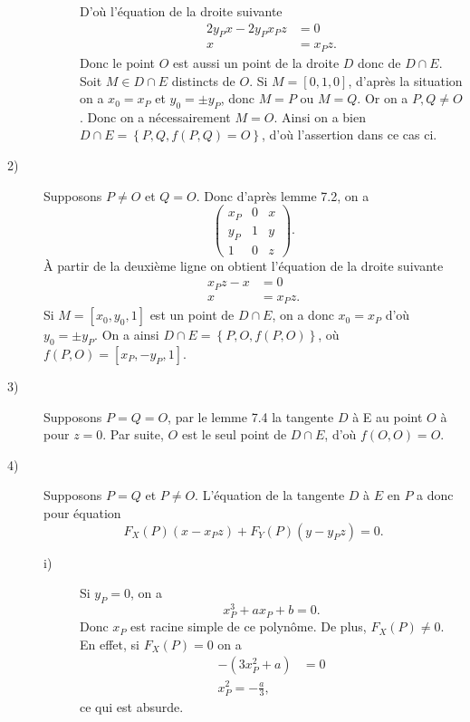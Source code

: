 \begin{demonstration}
\begin{description}
\begin{description}
               D'où l'équation de la droite suivante
               \begin{align*}
                   2y_Px - 2y_Px_Pz &= 0 \\
                   x &= x_Pz
               .\end{align*}
               Donc le point $O$ est aussi un point de la droite $D$ donc de $D \cap E$.  Soit $M \in  D \cap E$ distincts de $O$. Si $M = \left[ 0,1,0 \right]$, d'après la situation on a $x_0 =
               x_P$ et $y_0 = \pm y_P$, donc $M = P$ ou $M = Q$. Or on a $P,Q \neq O$. Donc on a nécessairement $M = O$. Ainsi on a bien $D \cap E = \left\{ P, Q, f(P,Q)= O \right\}$, d'où
               l'assertion dans ce cas ci.
            \end{description}
        \item[2)] Supposons $P \neq O$ et $Q = O$. Donc d'après lemme 7.2, on a
            \[
            \begin{pmatrix}
                x_P & 0 & x \\
                y_P & 1 & y \\
                1   & 0 & z
            \end{pmatrix}
            .\] 
            À partir de la deuxième ligne on obtient l'équation de la droite suivante
            \begin{align*}
                x_Pz - x &= 0 \\
                x &= x_Pz
            .\end{align*}
            Si $M = \left[ x_0, y_0, 1 \right]$ est un point de $D \cap E$, on a donc $x_0 = x_P$ d'où $y_0 = \pm y_P$.
        On a ainsi $D \cap E = \left\{ P, O, f(P,O) \right\}$, où $f(P,O) = \left[ x_P, - y_P, 1 \right]$.
    \item[3)] Supposons $P = Q = O$, par le lemme 7.4 la tangente $D$ à E au point $O$ à pour $z = 0$. Par suite, $O$ est le seul point de $D \cap E$, d'où $f(O,O) = O$.
    \item[4)] Supposons $P = Q$ et $P \neq O$. L'équation de la tangente $D$ à $E$ en $P$ a donc pour équation 
        \[
        F_{X}(P)\left( x - x_Pz \right) + F_{Y}(P)\left( y - y_Pz \right) = 0
        .\] 
        \begin{description}
            \item[i)] Si $y_P = 0$, on a
                \[
                x_P^3 + ax_P + b = 0
                .\] 
                Donc $x_P$ est racine simple de ce polynôme. De plus, $F_{X}(P) \neq 0$.
                En effet, si $F_{X}(P) = 0$ on a
                \begin{align*}
                    - \left( 3x_P^2 + a \right) &= 0 \\
                    x_P^2 = - \frac{a}{3}
                ,\end{align*}
                ce qui est absurde.


\end{description}
\end{description}
\end{demonstration}
